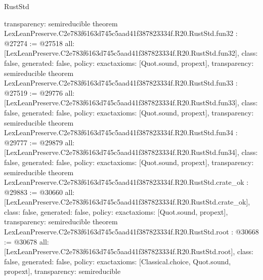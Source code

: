 \begin{lexlean}{RustStd}
\begin{coremodule}
{  transparency: semireducible
}
theorem LexLeanPreserve.C2e783f6163d745c5aad41f387823334f.R20.RustStd.fun32 : @27274 := @27518 {
  all: [LexLeanPreserve.C2e783f6163d745c5aad41f387823334f.R20.RustStd.fun32],
  class: false,
  generated: false,
  policy: exact{axioms: [Quot.sound, propext]},
  transparency: semireducible
}
theorem LexLeanPreserve.C2e783f6163d745c5aad41f387823334f.R20.RustStd.fun33 : @27519 := @29776 {
  all: [LexLeanPreserve.C2e783f6163d745c5aad41f387823334f.R20.RustStd.fun33],
  class: false,
  generated: false,
  policy: exact{axioms: [Quot.sound, propext]},
  transparency: semireducible
}
theorem LexLeanPreserve.C2e783f6163d745c5aad41f387823334f.R20.RustStd.fun34 : @29777 := @29879 {
  all: [LexLeanPreserve.C2e783f6163d745c5aad41f387823334f.R20.RustStd.fun34],
  class: false,
  generated: false,
  policy: exact{axioms: [Quot.sound, propext]},
  transparency: semireducible
}
theorem LexLeanPreserve.C2e783f6163d745c5aad41f387823334f.R20.RustStd.crate_ok : @29883 := @30660 {
  all: [LexLeanPreserve.C2e783f6163d745c5aad41f387823334f.R20.RustStd.crate_ok],
  class: false,
  generated: false,
  policy: exact{axioms: [Quot.sound, propext]},
  transparency: semireducible
}
theorem LexLeanPreserve.C2e783f6163d745c5aad41f387823334f.R20.RustStd.root : @30668 := @30678 {
  all: [LexLeanPreserve.C2e783f6163d745c5aad41f387823334f.R20.RustStd.root],
  class: false,
  generated: false,
  policy: exact{axioms: [Classical.choice, Quot.sound, propext]},
  transparency: semireducible
}


\end{coremodule}
\end{lexlean}
